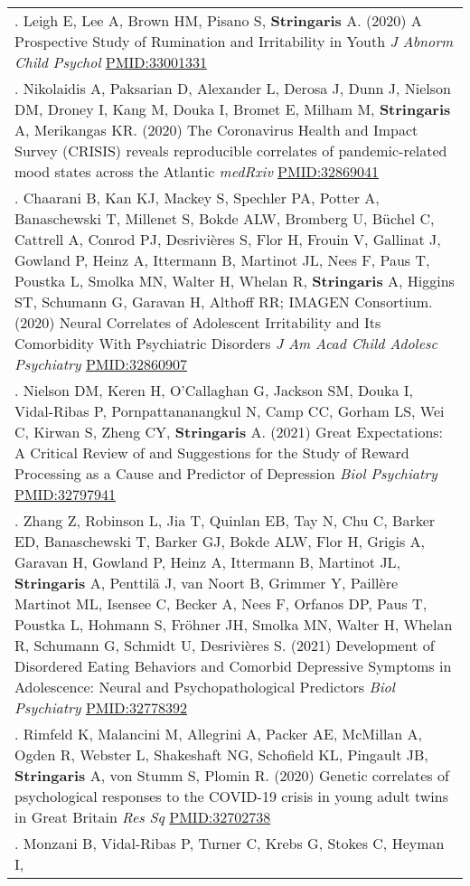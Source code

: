 \documentclass[
]{article}
\begin{document}
\begin{longtable}[]{@{}
  >{\raggedright\arraybackslash}p{}@{}}
60. Leigh E, Lee A, Brown HM, Pisano S, \textbf{Stringaris} A. (2020) A
Prospective Study of Rumination and Irritability in Youth \emph{J Abnorm
Child Psychol} \url{PMID:33001331} \\
61. Nikolaidis A, Paksarian D, Alexander L, Derosa J, Dunn J, Nielson
DM, Droney I, Kang M, Douka I, Bromet E, Milham M, \textbf{Stringaris}
A, Merikangas KR. (2020) The Coronavirus Health and Impact Survey
(CRISIS) reveals reproducible correlates of pandemic-related mood states
across the Atlantic \emph{medRxiv} \url{PMID:32869041} \\
62. Chaarani B, Kan KJ, Mackey S, Spechler PA, Potter A, Banaschewski T,
Millenet S, Bokde ALW, Bromberg U, Büchel C, Cattrell A, Conrod PJ,
Desrivières S, Flor H, Frouin V, Gallinat J, Gowland P, Heinz A,
Ittermann B, Martinot JL, Nees F, Paus T, Poustka L, Smolka MN, Walter
H, Whelan R, \textbf{Stringaris} A, Higgins ST, Schumann G, Garavan H,
Althoff RR; IMAGEN Consortium. (2020) Neural Correlates of Adolescent
Irritability and Its Comorbidity With Psychiatric Disorders \emph{J Am
Acad Child Adolesc Psychiatry} \url{PMID:32860907} \\
63. Nielson DM, Keren H, O'Callaghan G, Jackson SM, Douka I, Vidal-Ribas
P, Pornpattananangkul N, Camp CC, Gorham LS, Wei C, Kirwan S, Zheng CY,
\textbf{Stringaris} A. (2021) Great Expectations: A Critical Review of
and Suggestions for the Study of Reward Processing as a Cause and
Predictor of Depression \emph{Biol Psychiatry} \url{PMID:32797941} \\
64. Zhang Z, Robinson L, Jia T, Quinlan EB, Tay N, Chu C, Barker ED,
Banaschewski T, Barker GJ, Bokde ALW, Flor H, Grigis A, Garavan H,
Gowland P, Heinz A, Ittermann B, Martinot JL, \textbf{Stringaris} A,
Penttilä J, van Noort B, Grimmer Y, Paillère Martinot ML, Isensee C,
Becker A, Nees F, Orfanos DP, Paus T, Poustka L, Hohmann S, Fröhner JH,
Smolka MN, Walter H, Whelan R, Schumann G, Schmidt U, Desrivières S.
(2021) Development of Disordered Eating Behaviors and Comorbid
Depressive Symptoms in Adolescence: Neural and Psychopathological
Predictors \emph{Biol Psychiatry} \url{PMID:32778392} \\
65. Rimfeld K, Malancini M, Allegrini A, Packer AE, McMillan A, Ogden R,
Webster L, Shakeshaft NG, Schofield KL, Pingault JB, \textbf{Stringaris}
A, von Stumm S, Plomin R. (2020) Genetic correlates of psychological
responses to the COVID-19 crisis in young adult twins in Great Britain
\emph{Res Sq} \url{PMID:32702738} \\
66. Monzani B, Vidal-Ribas P, Turner C, Krebs G, Stokes C, Heyman I,

\end{longtable}
\end{document}
